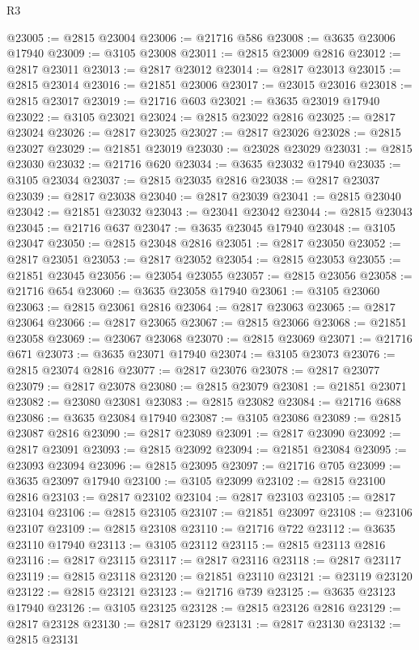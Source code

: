 \begin{lexlean}{R3}
\begin{coremodule}
@23005 := @2815 @23004
@23006 := @21716 @586
@23008 := @3635 @23006 @17940
@23009 := @3105 @23008
@23011 := @2815 @23009 @2816
@23012 := @2817 @23011
@23013 := @2817 @23012
@23014 := @2817 @23013
@23015 := @2815 @23014
@23016 := @21851 @23006
@23017 := @23015 @23016
@23018 := @2815 @23017
@23019 := @21716 @603
@23021 := @3635 @23019 @17940
@23022 := @3105 @23021
@23024 := @2815 @23022 @2816
@23025 := @2817 @23024
@23026 := @2817 @23025
@23027 := @2817 @23026
@23028 := @2815 @23027
@23029 := @21851 @23019
@23030 := @23028 @23029
@23031 := @2815 @23030
@23032 := @21716 @620
@23034 := @3635 @23032 @17940
@23035 := @3105 @23034
@23037 := @2815 @23035 @2816
@23038 := @2817 @23037
@23039 := @2817 @23038
@23040 := @2817 @23039
@23041 := @2815 @23040
@23042 := @21851 @23032
@23043 := @23041 @23042
@23044 := @2815 @23043
@23045 := @21716 @637
@23047 := @3635 @23045 @17940
@23048 := @3105 @23047
@23050 := @2815 @23048 @2816
@23051 := @2817 @23050
@23052 := @2817 @23051
@23053 := @2817 @23052
@23054 := @2815 @23053
@23055 := @21851 @23045
@23056 := @23054 @23055
@23057 := @2815 @23056
@23058 := @21716 @654
@23060 := @3635 @23058 @17940
@23061 := @3105 @23060
@23063 := @2815 @23061 @2816
@23064 := @2817 @23063
@23065 := @2817 @23064
@23066 := @2817 @23065
@23067 := @2815 @23066
@23068 := @21851 @23058
@23069 := @23067 @23068
@23070 := @2815 @23069
@23071 := @21716 @671
@23073 := @3635 @23071 @17940
@23074 := @3105 @23073
@23076 := @2815 @23074 @2816
@23077 := @2817 @23076
@23078 := @2817 @23077
@23079 := @2817 @23078
@23080 := @2815 @23079
@23081 := @21851 @23071
@23082 := @23080 @23081
@23083 := @2815 @23082
@23084 := @21716 @688
@23086 := @3635 @23084 @17940
@23087 := @3105 @23086
@23089 := @2815 @23087 @2816
@23090 := @2817 @23089
@23091 := @2817 @23090
@23092 := @2817 @23091
@23093 := @2815 @23092
@23094 := @21851 @23084
@23095 := @23093 @23094
@23096 := @2815 @23095
@23097 := @21716 @705
@23099 := @3635 @23097 @17940
@23100 := @3105 @23099
@23102 := @2815 @23100 @2816
@23103 := @2817 @23102
@23104 := @2817 @23103
@23105 := @2817 @23104
@23106 := @2815 @23105
@23107 := @21851 @23097
@23108 := @23106 @23107
@23109 := @2815 @23108
@23110 := @21716 @722
@23112 := @3635 @23110 @17940
@23113 := @3105 @23112
@23115 := @2815 @23113 @2816
@23116 := @2817 @23115
@23117 := @2817 @23116
@23118 := @2817 @23117
@23119 := @2815 @23118
@23120 := @21851 @23110
@23121 := @23119 @23120
@23122 := @2815 @23121
@23123 := @21716 @739
@23125 := @3635 @23123 @17940
@23126 := @3105 @23125
@23128 := @2815 @23126 @2816
@23129 := @2817 @23128
@23130 := @2817 @23129
@23131 := @2817 @23130
@23132 := @2815 @23131

\end{coremodule}
\end{lexlean}
